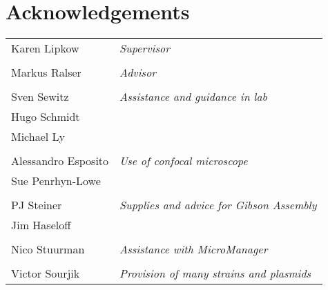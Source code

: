 \documentclass[../main.tex]{subfiles}
\begin{document}
\section*{Acknowledgements}

\begin{tabular}{p{5cm}l}
Karen Lipkow					&	\textit{Supervisor}\\&\\
Markus Ralser				&	\textit{Advisor}\\&\\
Sven Sewitz					& 	{\textit{Assistance and guidance in lab}}\\
Hugo Schmidt					&	\\
Michael Ly					&	\\&\\
Alessandro Esposito			&	{\textit{Use of confocal microscope}}\\
Sue Penrhyn-Lowe				&	\\&\\
PJ Steiner					&	{\textit{Supplies and advice for Gibson Assembly}}\\
Jim Haseloff					&	\\&\\
Nico Stuurman				&	\textit{Assistance with MicroManager}\\&\\
Victor Sourjik				&	\textit{Provision of many strains and plasmids}
\end{tabular}
\end{document}
